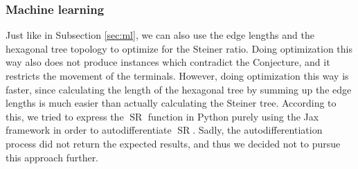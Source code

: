 \documentclass{mpaper}
\begin{document}
\subsubsection{Machine learning}

Just like in Subsection \ref{sec:ml}, we can also use the edge lengths and the hexagonal tree topology to optimize for the Steiner ratio. Doing optimization this way also does not produce instances which contradict the Conjecture, and it restricts the movement of the terminals. However, doing optimization this way is faster, since calculating the length of the hexagonal tree by summing up the edge lengths is much easier than actually calculating the Steiner tree. According to this, we tried to express the $\operatorname{SR}$ function in Python purely using the Jax framework in order to autodifferentiate $\operatorname{SR}$. Sadly, the autodifferentiation process did not return the expected results, and thus we decided not to pursue this approach further.

\end{document}
